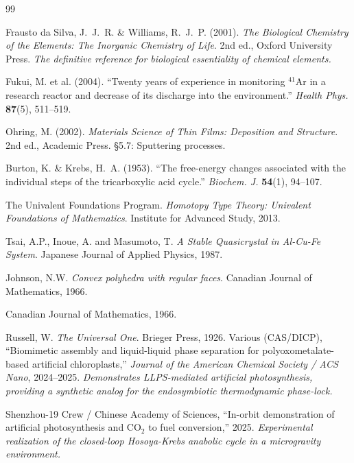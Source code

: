 \begin{thebibliography}{99}

Frausto da Silva, J.~J.~R. \& Williams, R.~J.~P. (2001).
\textit{The Biological Chemistry of the Elements: The Inorganic Chemistry of Life}.
2nd ed., Oxford University Press.
\textit{The definitive reference for biological essentiality of chemical elements.}

Fukui, M. et al. (2004).
``Twenty years of experience in monitoring ${}^{41}$Ar in a research reactor and decrease of its discharge into the environment.''
\textit{Health Phys.} \textbf{87}(5), 511--519.

Ohring, M. (2002).
\textit{Materials Science of Thin Films: Deposition and Structure}.
2nd ed., Academic Press. \S5.7: Sputtering processes.

Burton, K. \& Krebs, H.~A. (1953).
``The free-energy changes associated with the individual steps of the tricarboxylic acid cycle.''
\textit{Biochem. J.} \textbf{54}(1), 94--107.


The Univalent Foundations Program.
\newblock \emph{Homotopy Type Theory: Univalent Foundations of Mathematics}.
\newblock Institute for Advanced Study, 2013.

Tsai, A.P., Inoue, A. and Masumoto, T.
\newblock \emph{A Stable Quasicrystal in Al-Cu-Fe System}.
\newblock Japanese Journal of Applied Physics, 1987.

Johnson, N.W.
\newblock \emph{Convex polyhedra with regular faces}.
\newblock Canadian Journal of Mathematics, 1966.

\newblock Canadian Journal of Mathematics, 1966.

Russell, W.
\newblock \emph{The Universal One}.
\newblock Brieger Press, 1926.
Various (CAS/DICP),
``Biomimetic assembly and liquid-liquid phase separation for polyoxometalate-based artificial chloroplasts,''
\emph{Journal of the American Chemical Society / ACS Nano}, 2024--2025.
\textit{Demonstrates LLPS-mediated artificial photosynthesis, providing a synthetic analog for the endosymbiotic thermodynamic phase-lock.}

Shenzhou-19 Crew / Chinese Academy of Sciences,
``In-orbit demonstration of artificial photosynthesis and $\text{CO}_2$ to fuel conversion,''
2025.
\textit{Experimental realization of the closed-loop Hosoya-Krebs anabolic cycle in a microgravity environment.}




\end{thebibliography}
